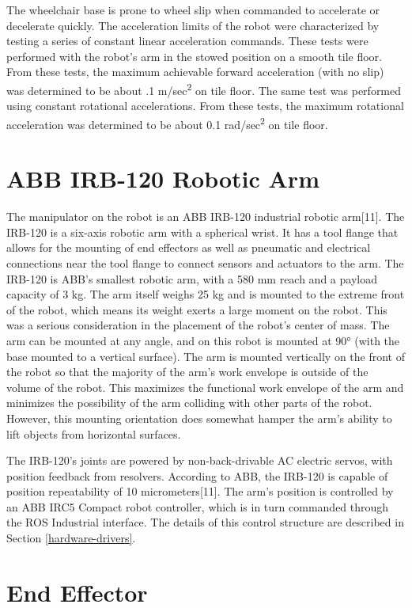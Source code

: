 \documentclass[]{cwru} %
\begin{document}
The wheelchair base is prone to wheel slip when commanded to accelerate
or decelerate quickly. The acceleration limits of the robot were
characterized by testing a series of constant linear acceleration
commands. These tests were performed with the robot's arm in the stowed
position on a smooth tile floor. From these tests, the maximum
achievable forward acceleration (with no slip) was determined to be
about .1 m/sec\textsuperscript{2} on tile floor. The same test was
performed using constant rotational accelerations. From these tests, the
maximum rotational acceleration was determined to be about 0.1
rad/sec\textsuperscript{2} on tile floor.

\section{ABB IRB-120 Robotic Arm}

The manipulator on the robot is an ABB IRB-120 industrial robotic
arm{[}11{]}. The IRB-120 is a six-axis robotic arm with a spherical
wrist. It has a tool flange that allows for the mounting of end
effectors as well as pneumatic and electrical connections near the tool
flange to connect sensors and actuators to the arm. The IRB-120 is ABB's
smallest robotic arm, with a 580 mm reach and a payload capacity of 3
kg. The arm itself weighs 25 kg and is mounted to the extreme front of
the robot, which means its weight exerts a large moment on the robot.
This was a serious consideration in the placement of the robot's center
of mass. The arm can be mounted at any angle, and on this robot is
mounted at 90° (with the base mounted to a vertical surface). The arm is
mounted vertically on the front of the robot so that the majority of the
arm's work envelope is outside of the volume of the robot. This
maximizes the functional work envelope of the arm and minimizes the
possibility of the arm colliding with other parts of the robot. However,
this mounting orientation does somewhat hamper the arm's ability to lift
objects from horizontal surfaces.

The IRB-120's joints are powered by non-back-drivable AC electric
servos, with position feedback from resolvers. According to ABB, the
IRB-120 is capable of position repeatability of 10 micrometers{[}11{]}.
The arm's position is controlled by an ABB IRC5 Compact robot
controller, which is in turn commanded through the ROS Industrial
interface. The details of this control structure are described in Section
\ref{hardware-drivers}.

\section{End Effector}
\end{document}
